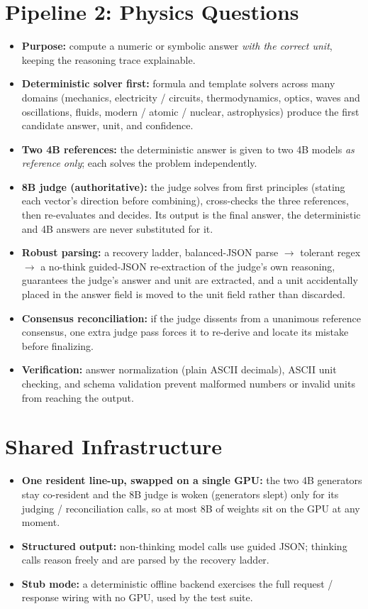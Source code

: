 \documentclass[10pt]{article}
\begin{document}
\section*{Pipeline 2: Physics Questions}
\begin{itemize}
\item \textbf{Purpose:} compute a numeric or symbolic answer \emph{with the
correct unit}, keeping the reasoning trace explainable.
\item \textbf{Deterministic solver first:} formula and template solvers across
many domains (mechanics, electricity / circuits, thermodynamics, optics, waves
and oscillations, fluids, modern / atomic / nuclear, astrophysics) produce the
first candidate answer, unit, and confidence.
\item \textbf{Two 4B references:} the deterministic answer is given to two 4B
models \emph{as reference only}; each solves the problem independently.
\item \textbf{8B judge (authoritative):} the judge solves from first principles
(stating each vector's direction before combining), cross-checks the three
references, then re-evaluates and decides. Its output is the final answer, the
deterministic and 4B answers are never substituted for it.
\item \textbf{Robust parsing:} a recovery ladder, balanced-JSON parse
$\rightarrow$ tolerant regex $\rightarrow$ a no-think guided-JSON re-extraction of
the judge's own reasoning, guarantees the judge's answer and unit are extracted,
and a unit accidentally placed in the answer field is moved to the unit field
rather than discarded.
\item \textbf{Consensus reconciliation:} if the judge dissents from a unanimous
reference consensus, one extra judge pass forces it to re-derive and locate its
mistake before finalizing.
\item \textbf{Verification:} answer normalization (plain ASCII decimals), ASCII
unit checking, and schema validation prevent malformed numbers or invalid units
from reaching the output.
\end{itemize}

\section*{Shared Infrastructure}
\begin{itemize}
\item \textbf{One resident line-up, swapped on a single GPU:} the two 4B
generators stay co-resident and the 8B judge is woken (generators slept) only for
its judging / reconciliation calls, so at most 8B of weights sit on the GPU at
any moment.
\item \textbf{Structured output:} non-thinking model calls use guided JSON;
thinking calls reason freely and are parsed by the recovery ladder.
\item \textbf{Stub mode:} a deterministic offline backend exercises the full
request / response wiring with no GPU, used by the test suite.
\end{itemize}
\end{document}
